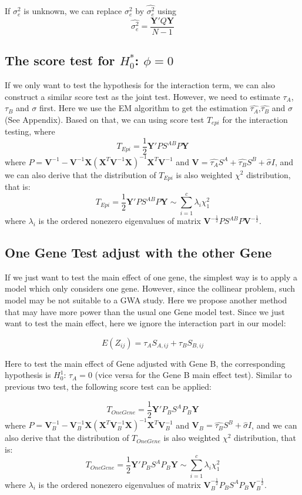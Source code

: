 \documentclass{article}
\newcommand{\Y}{\mathbf{Y}}
\newcommand{\X}{\mathbf{X}}
\newcommand{\V}{\mathbf{V}}
\newcommand{\VV}{\mathbf{V}^{-1}}
\begin{document}
        If $\sigma^2_e$ is unknown, we can replace $\sigma^2_e$ by $\hat{\sigma^2_e}$ using
        \[
            \hat{\sigma^2_e}=\frac{\Y'Q\Y}{N-1}
        \]

        \subsection{The score test for $H_0^*$: $\phi=0$}
        If we only want to test the hypothesis for the interaction term, we can also construct a similar score test as the joint test. However, we need to estimate $\tau_A$, $\tau_B$ and $\sigma$ first. Here we use the EM algorithm to get the estimation $\hat{\tau_A}$,$\hat{\tau_B}$ and $\hat{\sigma}$(See Appendix). Based on that, we can using score test $T_{epi}$ for the interaction testing, where
        \[
            T_{Epi}=\frac{1}{2}\Y'PS^{AB}P\Y
        \]
        where $P=\VV-\VV\X(\X^T\VV\X)^{-1}\X^T\VV$ and $\V=\hat{\tau_A}S^A+\hat{\tau_B}S^B+\hat{\sigma}I$, and we can also derive that the distribution of $T_{Epi}$ is also weighted $\chi^2$ distribution, that is:
        \[
            T_{Epi}=\frac{1}{2}\Y'PS^{AB}P\Y\sim\sum_{i=1}^c\lambda_i\chi^2_1
        \]
        where $\lambda_i$ is the  ordered nonezero eigenvalues of matrix $\V^{-\frac{1}{2}}PS^{AB}P\V^{-\frac{1}{2}}$.

        \subsection{One Gene Test adjust with the other Gene}

        If we just want to test the main effect of one gene, the simplest way is to apply a model which only considers one gene. However, since the collinear problem, such model may be not suitable to a GWA study. Here we propose another method that may have more power than the usual one Gene model test. Since we just want to test the main effect, here we ignore the interaction part in our model:

        \[
            E(Z_{ij})=\tau_AS_{A,ij}+\tau_BS_{B,ij}
        \]

        Here to test the main effect of Gene adjusted with Gene B, the corresponding hypothesis is $H_0^1$: $\tau_A=0$ (vice versa for the Gene B main effect test). Similar to previous two test, the following score test can be applied:

        \[
            T_{OneGene}=\frac{1}{2}\Y'P_BS^{A}P_B\Y
        \]
        where $P=\VV_B-\VV_B\X(\X^T\VV_B\X)^{-1}\X^T\VV_B$ and $\V_B=\hat{\tau_B}S^B+\hat{\sigma}I$, and we can also derive that the distribution of $T_{OneGene}$ is also weighted $\chi^2$ distribution, that is:
        \[
            T_{OneGene}=\frac{1}{2}\Y'P_BS^{A}P_B\Y\sim\sum_{i=1}^c\lambda_i\chi^2_1
        \]
        where $\lambda_i$ is the  ordered nonezero eigenvalues of matrix $\V_B^{-\frac{1}{2}}P_BS^{A}P_B\V_B^{-\frac{1}{2}}$.
\end{document}
